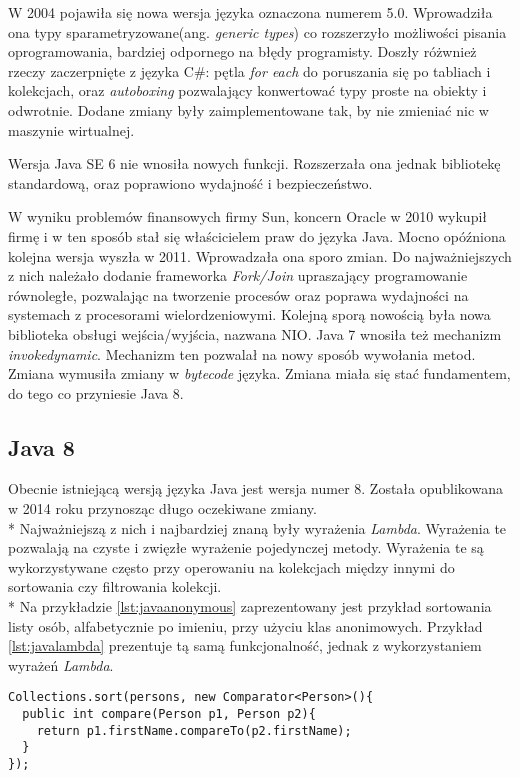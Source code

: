 W 2004 pojawiła się nowa wersja języka oznaczona numerem 5.0. Wprowadziła ona typy sparametryzowane(ang. \textsl{generic types}) co rozszerzyło możliwości pisania oprogramowania, bardziej odpornego na błędy programisty. Doszły różwnież rzeczy zaczerpnięte z języka C\#: pętla \textsl{for each} do poruszania się po tabliach i kolekcjach, oraz \textsl{autoboxing} pozwalający konwertować typy proste na obiekty i odwrotnie. Dodane zmiany były zaimplementowane tak, by nie zmieniać nic w maszynie wirtualnej.

Wersja Java SE 6 nie wnosiła nowych funkcji. Rozszerzała ona jednak bibliotekę standardową, oraz poprawiono wydajność i bezpieczeństwo.

W wyniku problemów finansowych firmy Sun, koncern Oracle w 2010 wykupił firmę i w ten sposób stał się właścicielem praw do języka Java. Mocno opóźniona kolejna wersja wyszła w 2011. Wprowadzała ona sporo zmian. Do najważniejszych z nich należało dodanie frameworka \textsl{Fork/Join} upraszający programowanie równoległe, pozwalając na tworzenie procesów oraz poprawa wydajności na systemach z procesorami wielordzeniowymi. Kolejną sporą nowością była nowa biblioteka obsługi wejścia/wyjścia, nazwana NIO. Java 7 wnosiła też mechanizm \textsl{invokedynamic}. Mechanizm ten pozwalał na nowy sposób wywołania metod. Zmiana wymusiła zmiany w \textsl{bytecode} języka. Zmiana miała się stać fundamentem, do tego co przyniesie Java 8.

\subsection{Java 8}
Obecnie istniejącą wersją języka Java jest wersja numer 8. Została opublikowana w 2014 roku przynosząc długo oczekiwane zmiany.\\*
Najważniejszą z nich i najbardziej znaną były wyrażenia \textsl{Lambda}. Wyrażenia te pozwalają na czyste i zwięzłe wyrażenie pojedynczej metody. Wyrażenia te są wykorzystywane często przy operowaniu na kolekcjach między innymi do sortowania czy filtrowania kolekcji.\\*
Na przykładzie \ref{lst:javaanonymous} zaprezentowany jest przykład sortowania listy osób, alfabetycznie po imieniu, przy użyciu klas anonimowych. Przykład \ref{lst:javalambda} prezentuje tą samą funkcjonalność, jednak z wykorzystaniem wyrażeń \textsl{Lambda}. 

\begin{lstlisting}[caption=Sortowanie kolekcji przy użyciu klas anonimowych, label={lst:javaanonymous}]
Collections.sort(persons, new Comparator<Person>(){
  public int compare(Person p1, Person p2){
    return p1.firstName.compareTo(p2.firstName);
  }
});
\end{lstlisting}

